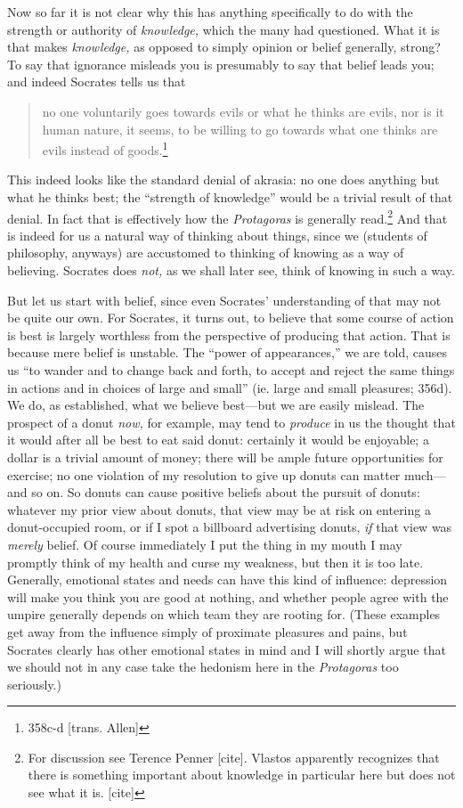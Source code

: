 \documentclass[11pt]{amsart}
\begin{document}
Now so far it is not clear why this has anything specifically to do
with the strength or authority of \emph{knowledge,} which the many had
questioned. What it is that makes \emph{knowledge,} as opposed to
simply opinion or belief generally, strong? To say that ignorance
misleads you is presumably to say that belief leads you; and indeed
Socrates tells us that \begin{quote}no one voluntarily goes towards
evils or what he thinks are evils, nor is it human nature, it seems,
to be willing to go towards what one thinks are evils instead of
goods.\footnote{358c-d [trans. Allen]}\end{quote} This indeed looks
like the standard denial of akrasia: no one does anything but what he
thinks best; the ``strength of knowledge'' would be a trivial result
of that denial. In fact that is effectively how the \emph{Protagoras}
is generally read.\footnote{For discussion see Terence Penner [cite].
Vlastos apparently recognizes that there is something important about
knowledge in particular here but does not see what it is. [cite]} And
that is indeed for us a natural way of thinking about things, since we
(students of philosophy, anyways) are accustomed to thinking of
knowing as a way of believing. Socrates does \emph{not,} as we shall
later see, think of knowing in such a way.


But let us start with belief, since even Socrates' understanding of
that may not be quite our own. For Socrates, it turns out, to believe
that some course of action is best is largely worthless from the
perspective of producing that action. That is because mere belief is
unstable. The ``power of appearances,'' we are told, causes us ``to
wander and to change back and forth, to accept and reject the same
things in actions and in choices of large and small'' (ie. large and
small pleasures; 356d). We do, as established, what we believe
best---but we are easily mislead. The prospect of a donut \emph{now,}
for example, may tend to \emph{produce} in us the thought that it
would after all be best to eat said donut: certainly it would be
enjoyable; a dollar is a trivial amount of money; there will be ample
future opportunities for exercise; no one violation of my resolution
to give up donuts can matter much---and so on. So donuts can cause
positive beliefs about the pursuit of donuts: whatever my prior view
about donuts, that view may be at risk on entering a donut-occupied
room, or if I spot a billboard advertising donuts, \emph{if} that view
was \emph{merely} belief. Of course immediately I put the thing in my
mouth I may promptly think of my health and curse my weakness, but
then it is too late. Generally, emotional states and needs can have
this kind of influence: depression will make you think you are good at
nothing, and whether people agree with the umpire generally depends on
which team they are rooting for. (These examples get away from the
influence simply of proximate pleasures and pains, but Socrates
clearly has other emotional states in mind and I will shortly argue
that we should not in any case take the hedonism here in the
\emph{Protagoras} too seriously.)
\end{document}
